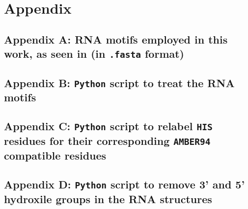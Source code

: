 \setcounter{page}{1}

\section{Appendix}

 

\subsection*{Appendix A: RNA motifs employed in this work, as seen in \cite{dolcemascolo_2022} (in \texttt{.fasta} format)}\label{appendix_A}



\subsection*{Appendix B: \texttt{Python} script to treat the RNA motifs}\label{appendix_B}



\subsection*{Appendix C: \texttt{Python} script to relabel \texttt{HIS} residues for their corresponding \texttt{AMBER94} compatible residues}\label{appendix_C}
\label{appendix_C}



\subsection*{Appendix D: \texttt{Python} script to remove 3' and 5' hydroxile groups in the RNA structures}\label{appendix_D}


